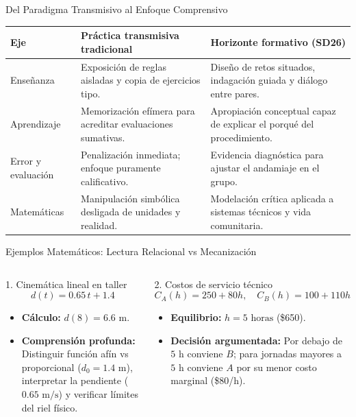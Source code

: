 \documentclass[aspectratio=169,spanish,xcolor=table]{beamer}
\begin{document}
\begin{frame}{Del Paradigma Transmisivo al Enfoque Comprensivo}
  \scriptsize\renewcommand{\arraystretch}{1.4}
  \begin{tabular}{p{2.3cm}p{5.4cm}p{5.4cm}}
    \toprule
    \rowcolor{iiiepePale} \textbf{Eje} & \textbf{Práctica transmisiva tradicional} & \textbf{Horizonte formativo (SD26)} \\
    \midrule
    Enseñanza & Exposición de reglas aisladas y copia de ejercicios tipo. & Diseño de retos situados, indagación guiada y diálogo entre pares. \\
    Aprendizaje & Memorización efímera para acreditar evaluaciones sumativas. & Apropiación conceptual capaz de explicar el porqué del procedimiento. \\
    Error y evaluación & Penalización inmediata; enfoque puramente calificativo. & Evidencia diagnóstica para ajustar el andamiaje en el grupo. \\
    Matemáticas & Manipulación simbólica desligada de unidades y realidad. & Modelación crítica aplicada a sistemas técnicos y vida comunitaria. \\
    \bottomrule
  \end{tabular}
\end{frame}

\begin{frame}{Ejemplos Matemáticos: Lectura Relacional vs Mecanización}
  \begin{columns}[T]
      \begin{block}{1. Cinemática lineal en taller}
        $$d(t) = 0.65\,t + 1.4$$
        \scriptsize
        \begin{itemize}
          \item \textbf{Cálculo:} $d(8) = 6.6\text{ m}$.
          \item \textbf{Comprensión profunda:} Distinguir función afín vs proporcional ($d_0 = 1.4\text{ m}$), interpretar la pendiente ($0.65\text{ m/s}$) y verificar límites del riel físico.
        \end{itemize}
      \end{block}
      \begin{block}{2. Costos de servicio técnico}
        $$C_A(h) = 250 + 80h, \quad C_B(h) = 100 + 110h$$
        \scriptsize
        \begin{itemize}
          \item \textbf{Equilibrio:} $h = 5\text{ horas}$ (\$650).
          \item \textbf{Decisión argumentada:} Por debajo de $5\text{ h}$ conviene $B$; para jornadas mayores a $5\text{ h}$ conviene $A$ por su menor costo marginal (\$80/h).
        \end{itemize}
      \end{block}
  \end{columns}
\end{frame}
\end{document}
